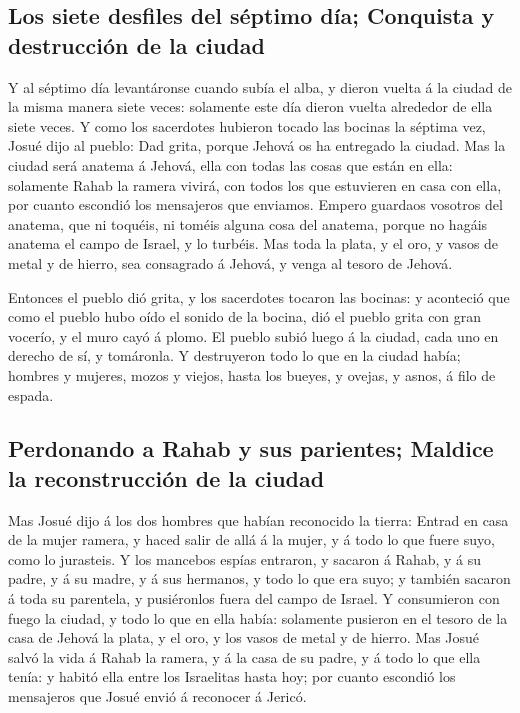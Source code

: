 \hypertarget{los-siete-desfiles-del-suxe9ptimo-duxeda-conquista-y-destrucciuxf3n-de-la-ciudad}{%
\subsection{Los siete desfiles del séptimo día; Conquista y destrucción
de la
ciudad}\label{los-siete-desfiles-del-suxe9ptimo-duxeda-conquista-y-destrucciuxf3n-de-la-ciudad}}

 Y al séptimo día levantáronse cuando subía el alba, y
dieron vuelta á la ciudad de la misma manera siete veces: solamente este
día dieron vuelta alrededor de ella siete veces.  Y como
los sacerdotes hubieron tocado las bocinas la séptima vez, Josué dijo al
pueblo: Dad grita, porque Jehová os ha entregado la ciudad.
 Mas la ciudad será anatema á Jehová, ella con todas las
cosas que están en ella: solamente Rahab la ramera vivirá, con todos los
que estuvieren en casa con ella, por cuanto escondió los mensajeros que
enviamos.  Empero guardaos vosotros del anatema, que ni
toquéis, ni toméis alguna cosa del anatema, porque no hagáis anatema el
campo de Israel, y lo turbéis.  Mas toda la plata, y el
oro, y vasos de metal y de hierro, sea consagrado á Jehová, y venga al
tesoro de Jehová.

 Entonces el pueblo dió grita, y los sacerdotes tocaron
las bocinas: y aconteció que como el pueblo hubo oído el sonido de la
bocina, dió el pueblo grita con gran vocerío, y el muro cayó á plomo. El
pueblo subió luego á la ciudad, cada uno en derecho de sí, y tomáronla.
 Y destruyeron todo lo que en la ciudad había; hombres y
mujeres, mozos y viejos, hasta los bueyes, y ovejas, y asnos, á filo de
espada.

\hypertarget{perdonando-a-rahab-y-sus-parientes-maldice-la-reconstrucciuxf3n-de-la-ciudad}{%
\subsection{Perdonando a Rahab y sus parientes; Maldice la
reconstrucción de la
ciudad}\label{perdonando-a-rahab-y-sus-parientes-maldice-la-reconstrucciuxf3n-de-la-ciudad}}

 Mas Josué dijo á los dos hombres que habían reconocido
la tierra: Entrad en casa de la mujer ramera, y haced salir de allá á la
mujer, y á todo lo que fuere suyo, como lo jurasteis.  Y
los mancebos espías entraron, y sacaron á Rahab, y á su padre, y á su
madre, y á sus hermanos, y todo lo que era suyo; y también sacaron á
toda su parentela, y pusiéronlos fuera del campo de Israel.
 Y consumieron con fuego la ciudad, y todo lo que en ella
había: solamente pusieron en el tesoro de la casa de Jehová la plata, y
el oro, y los vasos de metal y de hierro.  Mas Josué
salvó la vida á Rahab la ramera, y á la casa de su padre, y á todo lo
que ella tenía: y habitó ella entre los Israelitas hasta hoy; por cuanto
escondió los mensajeros que Josué envió á reconocer á Jericó.


